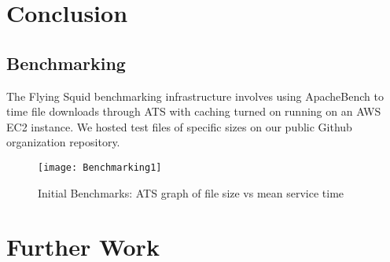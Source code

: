 \section{Conclusion}

\subsection{Benchmarking}

The Flying Squid  benchmarking infrastructure involves using ApacheBench to time file downloads through ATS with caching turned on running on an AWS EC2 instance. We hosted test files of specific sizes on our public Github organization repository.

\begin{figure}[H] \centering
\texttt{[image: Benchmarking1]}
\caption{Initial Benchmarks: ATS graph of file size vs mean service time}
\end{figure}


\section{Further Work}


